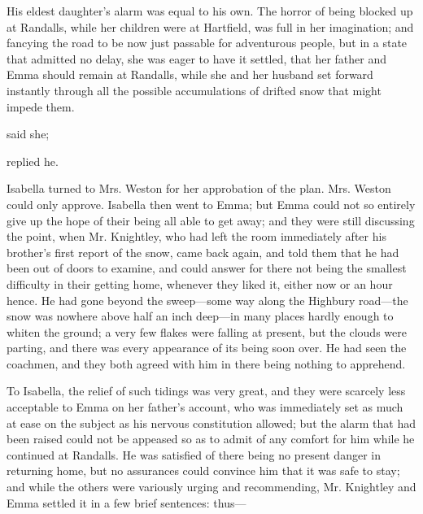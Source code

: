 His eldest daughter's alarm was equal to his own. The horror of being blocked up at Randalls, while her children were at Hartfield, was full in her imagination; and fancying the road to be now just passable for adventurous people, but in a state that admitted no delay, she was eager to have it settled, that her father and Emma should remain at Randalls, while she and her husband set forward instantly through all the possible accumulations of drifted snow that might impede them.

 said she; 

 replied he. 

Isabella turned to Mrs. Weston for her approbation of the plan. Mrs. Weston could only approve. Isabella then went to Emma; but Emma could not so entirely give up the hope of their being all able to get away; and they were still discussing the point, when Mr. Knightley, who had left the room immediately after his brother's first report of the snow, came back again, and told them that he had been out of doors to examine, and could answer for there not being the smallest difficulty in their getting home, whenever they liked it, either now or an hour hence. He had gone beyond the sweep---some way along the Highbury road---the snow was nowhere above half an inch deep---in many places hardly enough to whiten the ground; a very few flakes were falling at present, but the clouds were parting, and there was every appearance of its being soon over. He had seen the coachmen, and they both agreed with him in there being nothing to apprehend.

To Isabella, the relief of such tidings was very great, and they were scarcely less acceptable to Emma on her father's account, who was immediately set as much at ease on the subject as his nervous constitution allowed; but the alarm that had been raised could not be appeased so as to admit of any comfort for him while he continued at Randalls. He was satisfied of there being no present danger in returning home, but no assurances could convince him that it was safe to stay; and while the others were variously urging and recommending, Mr. Knightley and Emma settled it in a few brief sentences: thus---

